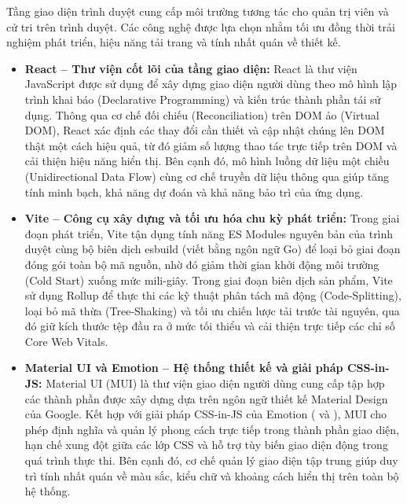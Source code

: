 Tầng giao diện trình duyệt cung cấp môi trường tương tác cho quản trị viên và cử tri trên trình duyệt. Các công nghệ được lựa chọn nhằm tối ưu đồng thời trải nghiệm phát triển, hiệu năng tải trang và tính nhất quán về thiết kế.

\begin{itemize}
    \item \textbf{React -- Thư viện cốt lõi của tầng giao diện:} React là thư viện JavaScript được sử dụng để xây dựng giao diện người dùng theo mô hình lập trình khai báo (Declarative Programming) và kiến trúc thành phần tái sử dụng. Thông qua cơ chế đối chiếu (Reconciliation) trên DOM ảo (Virtual DOM), React xác định các thay đổi cần thiết và cập nhật chúng lên DOM thật một cách hiệu quả, từ đó giảm số lượng thao tác trực tiếp trên DOM và cải thiện hiệu năng hiển thị. Bên cạnh đó, mô hình luồng dữ liệu một chiều (Unidirectional Data Flow) cùng cơ chế truyền dữ liệu thông qua  giúp tăng tính minh bạch, khả năng dự đoán và khả năng bảo trì của ứng dụng.


    \item \textbf{Vite -- Công cụ xây dựng và tối ưu hóa chu kỳ phát triển:} Trong giai đoạn phát triển, Vite tận dụng tính năng ES Modules nguyên bản của trình duyệt cùng bộ biên dịch esbuild (viết bằng ngôn ngữ Go) để loại bỏ giai đoạn đóng gói toàn bộ mã nguồn, nhờ đó giảm thời gian khởi động môi trường (Cold Start) xuống mức mili-giây. Trong giai đoạn biên dịch sản phẩm, Vite sử dụng Rollup để thực thi các kỹ thuật phân tách mã động (Code-Splitting), loại bỏ mã thừa (Tree-Shaking) và tối ưu chiến lược tải trước tài nguyên, qua đó giữ kích thước tệp đầu ra ở mức tối thiểu và cải thiện trực tiếp các chỉ số Core Web Vitals.

    \item \textbf{Material UI và Emotion -- Hệ thống thiết kế và giải pháp CSS-in-JS:} Material UI (MUI) là thư viện giao diện người dùng cung cấp tập hợp các thành phần được xây dựng dựa trên ngôn ngữ thiết kế Material Design của Google. Kết hợp với giải pháp CSS-in-JS của Emotion ( và ), MUI cho phép định nghĩa và quản lý phong cách trực tiếp trong thành phần giao diện, hạn chế xung đột giữa các lớp CSS và hỗ trợ tùy biến giao diện động trong quá trình thực thi. Bên cạnh đó, cơ chế quản lý giao diện tập trung giúp duy trì tính nhất quán về màu sắc, kiểu chữ và khoảng cách hiển thị trên toàn bộ hệ thống.

\end{itemize}

